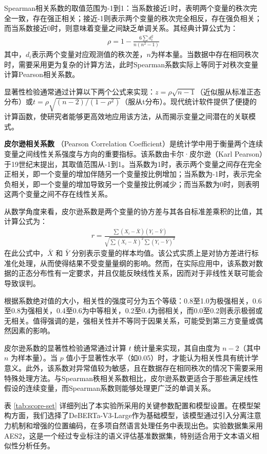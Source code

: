 Spearman相关系数的取值范围为-1到1：当系数接近1时，表明两个变量的秩次完全一致，存在强正相关；接近-1则表示两个变量的秩次完全相反，存在强负相关；而当系数接近0时，则意味着变量之间缺乏单调关系。其经典计算公式为：
\begin{align}
    \rho = 1 - \frac{6\sum d_i^2}{n(n^2-1)}
\end{align}
其中，\(d_i\)表示两个变量对应观测值的秩次差，\(n\)为样本量。当数据中存在相同秩次时，需要采用更为复杂的计算方法，此时Spearman系数实际上等同于对秩次变量计算Pearson相关系数。

显著性检验通常通过计算以下两个公式来实现：\(z = \rho \sqrt{n-1}\)（近似服从标准正态分布）或\(t = \rho \sqrt{(n-2)/(1-\rho^2)}\)（服从t分布）。现代统计软件提供了便捷的计算函数，使研究者能够更高效地应用该方法，从而揭示变量之间潜在的关联模式。

\textbf{皮尔逊相关系数} \cite{Pearson}（Pearson Correlation Coefficient）是统计学中用于衡量两个连续变量之间线性关系强度与方向的重要指标。该系数由卡尔·皮尔逊（Karl Pearson）于19世纪末提出，其取值范围从-1到1。当系数为1时，表示两个变量之间存在完全正相关，即一个变量的增加伴随另一个变量按比例增加；当系数为-1时，表示完全负相关，即一个变量的增加导致另一个变量按比例减少；而当系数为0时，则表明这两个变量之间不存在线性关系。

从数学角度来看，皮尔逊系数是两个变量的协方差与其各自标准差乘积的比值，其计算公式为：
\begin{align}
r = \frac{\sum{(X_i - \bar{X})(Y_i - \bar{Y})}}{\sqrt{\sum{(X_i - \bar{X})^2}\sum{(Y_i - \bar{Y})^2}}}
\end{align}
在此公式中，\(\bar{X}\) 和 \(\bar{Y}\) 分别表示变量的样本均值。该公式实质上是对协方差进行标准化处理，从而使得结果不受变量量纲的影响。然而，在实际应用中，该系数对数据的正态分布性有一定要求，并且仅能反映线性关系，因而对于非线性关联可能会导致误判。

根据系数绝对值的大小，相关性的强度可分为五个等级：0.8至1.0为极强相关，0.6至0.8为强相关，0.4至0.6为中等相关，0.2至0.4为弱相关，而0.0至0.2则表示极弱或无相关。值得强调的是，强相关性并不等同于因果关系，可能受到第三方变量或偶然因素的影响。

皮尔逊系数的显著性检验通常通过计算 \(t\) 统计量来实现，其自由度为 \(n-2\)（其中 \(n\) 为样本量）。当 \(p\) 值小于显著性水平（如0.05）时，才能认为相关性具有统计学意义。此外，该系数对异常值较为敏感，且在数据存在相同秩次的情况下需要采用特殊处理方法。与Spearman秩相关系数相比，皮尔逊系数更适合于那些满足线性假设的连续变量，而Spearman系数则能够处理更广泛的单调关系。

表 \ref{tab:score-set} 详细列出了本实验所采用的关键参数配置和模型设置。在模型架构方面，我们选择了DeBERTa-V3-Large作为基础模型，该模型通过引入分离注意力机制和增强的位置编码，在多项自然语言处理任务中表现出色。实验数据集采用AES2，这是一个经过专业标注的语义评估基准数据集，特别适合用于文本语义相似性分析任务。

